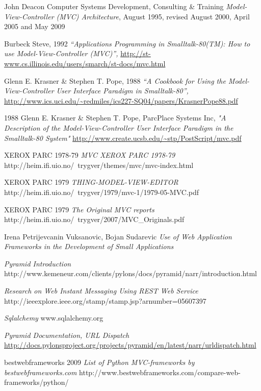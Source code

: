 \documentclass[finnish,utf8,nonumbib,palatino,kandi]{gradu2}
\begin{document}
\begin{thebibliography}{9} %
    John Deacon Computer Systems Development, Consulting \& Training
    \emph{Model-View-Controller (MVC) Architecture},
    August 1995, revised August 2000, April 2005 and May 2009

   Burbeck Steve, 1992
  \emph{“Applications Programming in Smalltalk-80(TM): How to use Model-View-Controller (MVC)”,}
  \url{http://st-www.cs.illinois.edu/users/smarch/st-docs/mvc.html}

   Glenn E. Krasner \& Stephen T. Pope, 1988
  \emph{“A Cookbook for Using the Model-View-Controller User Interface Paradigm in Smalltalk-80”,}
  \url{http://www.ics.uci.edu/~redmiles/ics227-SQ04/papers/KrasnerPope88.pdf}

 1988 Glenn E. Krasner \& Stephen T. Pope, ParcPlace Systems Inc,
	\emph{"A Description of the Model-View-Controller User Interface Paradigm in the Smalltalk-80 System"}
	\url{http://www.create.ucsb.edu/~stp/PostScript/mvc.pdf}

  XEROX PARC 1978-79
  \emph{MVC XEROX PARC 1978-79}
http://heim.ifi.uio.no/~trygver/themes/mvc/mvc-index.html

  XEROX PARC 1979
  \emph{THING-MODEL-VIEW-EDITOR}
   http://heim.ifi.uio.no/~trygver/1979/mvc-1/1979-05-MVC.pdf

  XEROX PARC 1979
  \emph{The Original MVC reports}
 http://heim.ifi.uio.no/~trygver/2007/MVC\_Originals.pdf

Irena Petrijevcanin Vuksanovic, Bojan Sudarevic
  \emph{Use of Web Application Frameworks in the Development of Small Applications}


  \emph{Pyramid Introduction}
   http://www.kemeneur.com/clients/pylons/docs/pyramid/narr/introduction.html

\emph{Research on Web Instant Messaging Using REST Web Service}
http://ieeexplore.ieee.org/stamp/stamp.jsp?arnumber=05607397

\emph{Sqlalchemy}
www.sqlalchemy.org

\emph{Pyramid Documentation, URL Dispatch}
\url{http://docs.pylonsproject.org/projects/pyramid/en/latest/narr/urldispatch.html}

bestwebframeworks 2009
\emph{List of Python MVC-frameworks by bestwebframeworks.com}
http://www.bestwebframeworks.com/compare-web-frameworks/python/

\end{thebibliography}
\end{document}
